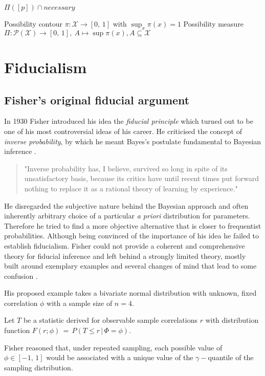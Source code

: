 \documentclass[
]{report}
\theoremstyle{definition}
\begin{document}
\(\Pi([p]) \cap necessary\)

Possibility contour \(\pi: \mathcal{X} \rightarrow [0, \, 1]\) with
\(\sup_x \pi (x) = 1\) Possibility measure
\(\Pi: \mathcal{P}(\mathcal{X}) \rightarrow [0, \, 1], \ A \mapsto \sup \pi (x), A \subseteq \mathcal{X}\)

\section{Fiducialism}
\subsection{Fisher's original fiducial argument}

In 1930 Fisher introduced his idea the \textit{fiducial principle} which
turned out to be one of his most controversial ideas of his career. He
criticised the concept of \textit{inverse probability}, by which he
meant Bayes's postulate fundamental to Bayesian inference
\cite{aldrich_r_1997}.

\begin{quote}
"Inverse probability has, I believe, survived so long in spite of its unsatisfactory basis, because its critics have until recent times put forward nothing to replace it as a rational theory of learning by experience." \cite{Fisher_1930}
\end{quote}

He disregarded the subjective nature behind the Bayesian approach and
often inherently arbitrary choice of a particular \textit{a priori}
distribution for parameters. Therefore he tried to find a more objective
alternative that is closer to frequentist probabilities. Although being
convinced of the importance of his idea he failed to establish
fiducialism. Fisher could not provide a coherent and comprehensive
theory for fiducial inference and left behind a strongly limited theory,
mostly built around exemplary examples and several changes of mind that
lead to some confusion \cite{zabell_r_nodate}.

His proposed example takes a bivariate normal distribution with unknown,
fixed correlation \(\phi\) with a sample size of \(n=4\).

Let \(T\) be a statistic derived for observable sample correlations
\(r\) with distribution function
\(F(r; \phi) \, = \, P(T \leq r \, | \, \Phi = \phi)\).

Fisher reasoned that, under repeated sampling, each possible value of
\(\phi \in [-1,\,1]\) would be associated with a unique value of the
\(\gamma-\)quantile of the sampling distribution.
\end{document}
